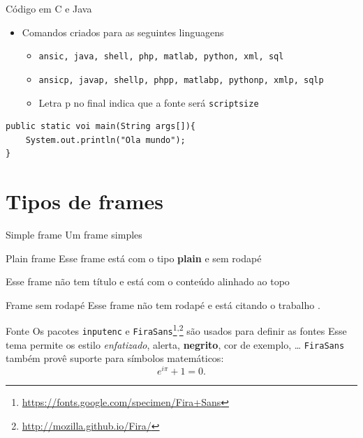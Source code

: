 \documentclass{beamer}
\let\olditem\item
\renewcommand{\item}{%
\olditem\vspace{\fill}}
\begin{document}
\begin{frame}[fragile]{Código em C e Java}

\begin{itemize}
		\item Comandos criados para as seguintes linguagens
		\begin{itemize}
			\item \texttt{ansic, java, shell, php, matlab, python, xml, sql}
			\item \texttt{ansicp, javap, shellp, phpp, matlabp, pythonp, xmlp, sqlp}
			\item Letra p no final indica que a fonte será \texttt{scriptsize}
		\end{itemize}
\end{itemize}



\javap
\begin{lstlisting}
public static voi main(String args[]){
	System.out.println("Ola mundo");
}
\end{lstlisting}		
\end{frame}

\section{Tipos de frames}

\begin{frame}{Simple frame}
Um frame simples
\end{frame}

\begin{frame}[plain]{Plain frame}
   Esse frame está com o tipo \textbf{plain} e sem rodapé
\end{frame}
    
\begin{frame}[t]
Esse frame não tem título e está com o conteúdo alinhado ao topo
\end{frame}
    
\begin{frame}[noframenumbering]{Frame sem rodapé}
 Esse frame não tem rodapé e está citando o trabalho \cite{knuth74}.
\end{frame}
    
    \begin{frame}{Fonte}
        Os pacotes \texttt{inputenc} e \texttt{FiraSans}\footnote{\url{https://fonts.google.com/specimen/Fira+Sans}}\textsuperscript{,}\footnote{\url{http://mozilla.github.io/Fira/}} são usados para definir as fontes
        \vfill
        Esse tema permite os estilo \emph{enfatizado}, \alert{alerta}, \textbf{negrito}, \textcolor{example}{cor de exemplo}, \dots
        \vfill
        \texttt{FiraSans} também provê suporte para símbolos matemáticos:
        \begin{equation*}
            e^{i\pi} + 1 = 0.
        \end{equation*}
    \end{frame}
\end{document}

